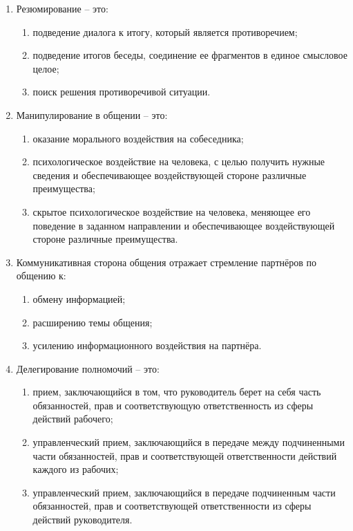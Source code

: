 \documentclass[12pt,pscyr]{hedwork}
\renewcommand{\labelenumii}{\asbuk{enumii})}
\newcommand{\itempo}{\stepcounter{enumii}\item[\bfseries\labelenumii]}
\begin{document}
\begin{enumerate}
    \item Резюмирование -- это:
      \begin{enumerate}
        \item подведение диалога к итогу, который является противоречием;
        \itempo подведение итогов беседы, соединение ее фрагментов в единое
          смысловое целое;
        \item поиск решения противоречивой ситуации.
      \end{enumerate}

    \item Манипулирование в общении -- это:
      \begin{enumerate}
        \item оказание морального воздействия на собеседника;
        \item психологическое воздействие на человека, с целью получить нужные
          сведения и обеспечивающее воздействующей стороне различные
          преимущества;
        \itempo скрытое психологическое воздействие на человека, меняющее его
          поведение в заданном направлении и обеспечивающее воздействующей
          стороне различные преимущества.
      \end{enumerate}

    \newpage
    \item Коммуникативная сторона общения отражает стремление партнёров по
      общению к:
      \begin{enumerate}
        \itempo обмену информацией;
        \item расширению темы общения;
        \item усилению информационного воздействия на партнёра.
      \end{enumerate}

    \item Делегирование полномочий -- это:
      \begin{enumerate}
        \item прием, заключающийся в том, что руководитель берет на себя часть
          обязанностей, прав и соответствующую ответственность из сферы
          действий рабочего;
        \item управленческий прием, заключающийся в передаче между подчиненными
          части обязанностей, прав и соответствующей ответственности действий
          каждого из рабочих;
        \itempo управленческий прием, заключающийся в передаче подчиненным
          части обязанностей, прав и соответствующей ответственности из сферы
          действий руководителя.
      \end{enumerate}


\end{enumerate}
\end{document}
